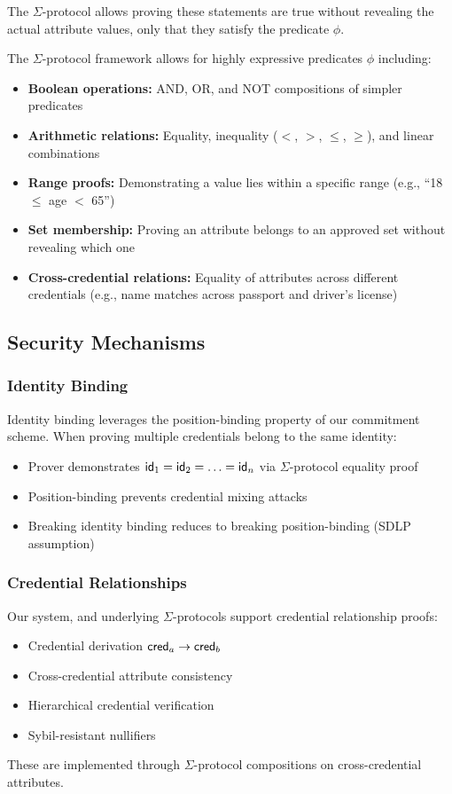 \begin{enumerate}
    The $\Sigma$-protocol allows proving these statements are true without revealing the actual attribute values, only that they satisfy the predicate $\phi$.

    
    The $\Sigma$-protocol framework allows for highly expressive predicates $\phi$ including:
    \begin{itemize}
    \item \textbf{Boolean operations:} AND, OR, and NOT compositions of simpler predicates
    \item \textbf{Arithmetic relations:} Equality, inequality ($<$, $>$, $\leq$, $\geq$), and linear combinations 
    \item \textbf{Range proofs:} Demonstrating a value lies within a specific range (e.g., ``18 $\leq$ age $<$ 65'')
    \item \textbf{Set membership:} Proving an attribute belongs to an approved set without revealing which one
    \item \textbf{Cross-credential relations:} Equality of attributes across different credentials (e.g., name matches across passport and driver's license)
    \end{itemize}

    
\end{enumerate}


\subsection{Security Mechanisms}

\subsubsection{Identity Binding}
Identity binding leverages the position-binding property of our commitment scheme. When proving multiple credentials belong to the same identity:
\begin{itemize}
    \item Prover demonstrates $\mathsf{id}_1 = \mathsf{id}_2 = \ldots = \mathsf{id}_n$ via $\Sigma$-protocol equality proof
    \item Position-binding prevents credential mixing attacks
    \item Breaking identity binding reduces to breaking position-binding (SDLP assumption)
\end{itemize}

\subsubsection{Credential Relationships}
Our system, and underlying $\Sigma$-protocols support credential relationship proofs:
\begin{itemize}
    \item Credential derivation $\mathsf{cred}_a \to \mathsf{cred}_b$
    \item Cross-credential attribute consistency
    \item Hierarchical credential verification
    \item Sybil-resistant nullifiers
\end{itemize}
These are implemented through $\Sigma$-protocol compositions on cross-credential attributes.

